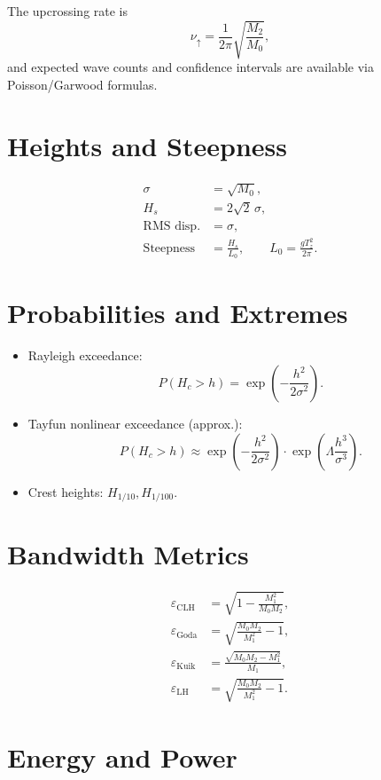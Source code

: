 \documentclass[11pt]{article}
\begin{document}
The upcrossing rate is
\begin{equation}
\nu_{\uparrow} = \frac{1}{2\pi} \sqrt{\frac{M_2}{M_0}},
\end{equation}
and expected wave counts and confidence intervals are available via Poisson/Garwood formulas.

\section{Heights and Steepness}

\begin{align}
\sigma &= \sqrt{M_0}, \\
H_s &= 2\sqrt{2} \, \sigma, \\
\text{RMS disp.} &= \sigma, \\
\text{Steepness} &= \frac{H_s}{L_0}, \qquad L_0 = \frac{g T_z^2}{2\pi}.
\end{align}

\section{Probabilities and Extremes}

\begin{itemize}
  \item Rayleigh exceedance:
  \[
  P(H_c > h) = \exp\!\left(-\frac{h^2}{2\sigma^2}\right).
  \]
  \item Tayfun nonlinear exceedance (approx.):
  \[
  P(H_c > h) \approx \exp\!\left(-\frac{h^2}{2\sigma^2}\right) \cdot
  \exp\!\left(\Lambda \frac{h^3}{\sigma^3}\right).
  \]
  \item Crest heights: $H_{1/10}, H_{1/100}$.
\end{itemize}

\section{Bandwidth Metrics}

\begin{align}
\varepsilon_{\text{CLH}} &= \sqrt{1 - \frac{M_1^2}{M_0 M_2}}, \\
\varepsilon_{\text{Goda}} &= \sqrt{\frac{M_0 M_2}{M_1^2} - 1}, \\
\varepsilon_{\text{Kuik}} &= \frac{\sqrt{M_0 M_2 - M_1^2}}{M_1}, \\
\varepsilon_{\text{LH}} &= \sqrt{\frac{M_0 M_2}{M_1^2} - 1}.
\end{align}

\section{Energy and Power}
\end{document}
